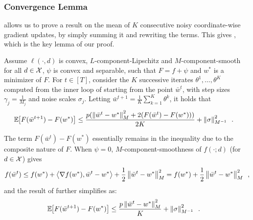 \subsubsection{Convergence Lemma}

 allows us to prove a result on the mean of $K$
consecutive noisy coordinate-wise gradient updates, by simply summing it and
rewriting the terms.
This gives , which is the key lemma of our
proof.
\begin{lemma}
  \label{lemma:dp-cd-convergence-lemma}
  Assume $\ell(\cdot, d)$ is convex, $L$-component-Lipschitz and
  $M$-component-smooth for all $d \in \mathcal X$, $\psi$ is convex and separable, such
  that $F = f + \psi$ and $w^*$ is a minimizer of $F$.
  For $t \in [T]$, consider the $K$ successive iterates $\theta^1, \dots, \theta^K$
  computed from the inner loop of  starting from the point $\bar w^t$,
  with step sizes $\gamma_j = \frac{1}{M_j}$ and noise scales
  $\sigma_j$.
  Letting $\bar w^{t+1}= \frac{1}{K} \sum_{k=1}^K \theta^k$,
  it holds that
  \begin{align}
    \mathbb E_{} \hspace{-0.29em} \left[ F(\bar w^{t+1}) - F(w^*) \right]
     & \le \frac{p(\left \lVert \bar w^t - w^* \right \rVert_M^2 + 2(F(\bar w^t) - F(w^*)))}{2K}
    + \left \lVert \sigma \right \rVert_{M^{-1}}^2\enspace.
  \end{align}
\end{lemma}

\begin{remark}
  The term $F(\bar w^t) - F(w^*)$ essentially remains in the inequality due to
  the composite nature of $F$.
  When %
  $\psi = 0$,
  $M$-component-smoothness of $f(\cdot; d)$ (for $d \in \mathcal X$) gives
  \begin{align}
    f(\bar w^t)
    \le f(w^*) + \left\langle \nabla f(w^*), \bar w^t - w^* \right\rangle + \frac{1}{2}\left \lVert \bar w^t - w^* \right \rVert_M^2
    = f(w^*) + \frac{1}{2}\left \lVert \bar w^t - w^* \right \rVert_M^2\enspace,
  \end{align}
  and the result of  further
  simplifies as:
  \begin{align}
    \mathbb E_{} \hspace{-0.29em} \left[ F(\bar w^{t+1}) - F(w^*) \right]
     & \le \frac{p\left \lVert \bar w^t - w^* \right \rVert_M^2}{K}
    + \left \lVert \sigma \right \rVert_{M^{-1}}^2\enspace.
  \end{align}
\end{remark}

